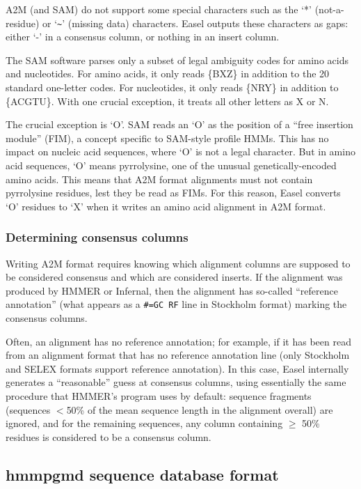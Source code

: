 A2M (and SAM) do not support some special characters such as the `*'
(not-a-residue) or `\verb+~+' (missing data) characters. Easel outputs these
characters as gaps: either `-' in a consensus column, or nothing in an
insert column.

The SAM software parses only a subset of legal ambiguity codes for
amino acids and nucleotides. For amino acids, it only reads \{BXZ\} in
addition to the 20 standard one-letter codes. For nucleotides, it only
reads \{NRY\} in addition to \{ACGTU\}. With one crucial exception, it
treats all other letters as X or N. 

The crucial exception is `O'. SAM reads an `O' as the position of a
``free insertion module'' (FIM), a concept specific to SAM-style
profile HMMs. This has no impact on nucleic acid sequences, where `O'
is not a legal character. But in amino acid sequences, `O' means
pyrrolysine, one of the unusual genetically-encoded amino acids.  This
means that A2M format alignments must not contain pyrrolysine
residues, lest they be read as FIMs. For this reason, Easel converts
`O' residues to `X' when it writes an amino acid alignment in A2M
format.

\subsubsection{Determining consensus columns}

Writing A2M format requires knowing which alignment columns are
supposed to be considered consensus and which are considered
inserts. If the alignment was produced by HMMER or Infernal, then the
alignment has so-called ``reference annotation'' (what appears as a
\verb+#=GC RF+ line in Stockholm format) marking the consensus
columns. 

Often, an alignment has no reference annotation; for example, if it
has been read from an alignment format that has no reference
annotation line (only Stockholm and SELEX formats support reference
annotation). In this case, Easel internally generates a ``reasonable''
guess at consensus columns, using essentially the same procedure that
HMMER's  program uses by default: sequence fragments
(sequences $<$50\% of the mean sequence length in the alignment
overall) are ignored, and for the remaining sequences, any column
containing $\geq$ 50\% residues is considered to be a consensus
column.





\subsection{hmmpgmd sequence database format}

